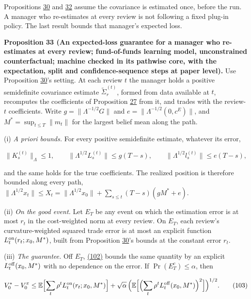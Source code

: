 \documentclass[11pt]{article}
\begin{document}
Propositions \hyperref[res:Proposition-30]{30} and \hyperref[res:Proposition-32]{32} assume the covariance is estimated once, before
the run. A manager who re-estimates at every review is not following a
fixed plug-in policy. The last result bounds that manager's expected
loss.

\label{res:Proposition-33}
\textbf{Proposition 33 (An expected-loss guarantee for a manager who re-estimates at every review; fund-of-funds learning model, unconstrained counterfactual; machine checked in its pathwise core, with the expectation, split and confidence-sequence steps at paper level).}
Use Proposition \hyperref[res:Proposition-30]{30}'s setting. At each review \(t\) the manager holds a
positive semidefinite covariance estimate \(\tilde\Sigma^{(t)}_r\), formed from
data available at \(t\), recomputes the coefficients of Proposition \hyperref[res:Proposition-27]{27}
from it, and trades with the review-\(t\) coefficients. Write
\(g=\|\Lambda^{-1/2}G\|\) and \(e=\|\Lambda^{-1/2}(0,c^E)\|\), and
\(M^*=\sup_{t\leq T}\|m_t\|\) for the largest belief mean along the path.

(i) \emph{A priori bounds.} For every positive semidefinite estimate,
whatever its error,

\begin{equation*}
\|K^{(t)}_s\|_\Lambda\leq1,\qquad
\|\Lambda^{1/2}L^{(t)}_s\|\leq g(T-s),\qquad
\|\Lambda^{1/2}l^{(t)}_s\|\leq e(T-s),\tag{102}\label{eq:102}
\end{equation*}

and the same holds for the true coefficients. The realized position
is therefore bounded along every path,
\(\|\Lambda^{1/2}x_t\|\leq X_t=\|\Lambda^{1/2}x_0\|+\sum_{s\leq t}(T-s)(gM^*+e)\).

(ii) \emph{On the good event.} Let \(E_T\) be any event on which the
estimation error is at most \(r_t\) in the cost-weighted norm at every
review. On \(E_T\), each review's curvature-weighted squared trade error
is at most an explicit function \(L^{\rm on}_t(r_t;x_0,M^*)\), built from
Proposition \hyperref[res:Proposition-30]{30}'s bounds at the constant error \(r_t\).

(iii) \emph{The guarantee.} Off \(E_T\), \hyperref[eq:102]{(102)} bounds the same quantity by an
explicit \(L^{\rm off}_t(x_0,M^*)\) with no dependence on the error. If
\(\Pr(E_T^c)\leq\alpha\), then

\begin{equation*}
V^*_0-V^\pi_0\leq\mathbb E\Bigl[\sum_t\rho^tL^{\rm on}_t(r_t;x_0,M^*)\Bigr]
 +\sqrt\alpha\,\Bigl(\mathbb E\Bigl[\Bigl(\sum_t\rho^tL^{\rm off}_t(x_0,M^*)\Bigr)^2\Bigr]\Bigr)^{1/2}.\tag{103}\label{eq:103}
\end{equation*}
\end{document}
